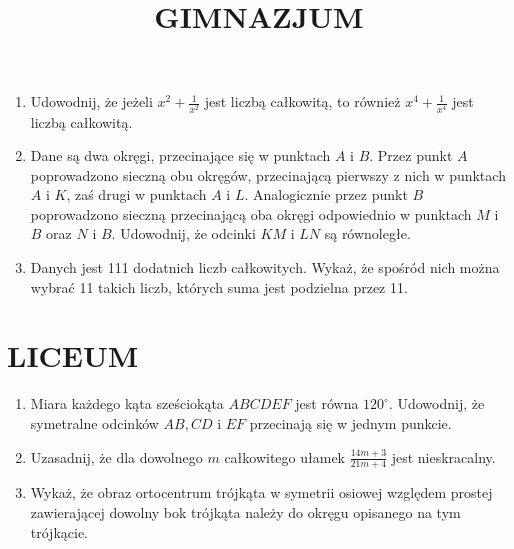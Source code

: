 \documentclass[10pt]{article}
\title{GIMNAZJUM }
\author{}
\date{}
\begin{document}
\maketitle
\begin{enumerate}
  \item Udowodnij, że jeżeli \(x^{2}+\frac{1}{x^{2}}\) jest liczbą całkowitą, to również \(x^{4}+\frac{1}{x^{4}}\) jest liczbą całkowitą.
  \item Dane są dwa okręgi, przecinające się w punktach \(A\) i \(B\). Przez punkt \(A\) poprowadzono sieczną obu okręgów, przecinającą pierwszy z nich w punktach \(A\) i \(K\), zaś drugi w punktach \(A\) i \(L\). Analogicznie przez punkt \(B\) poprowadzono sieczną przecinającą oba okręgi odpowiednio w punktach \(M\) i \(B\) oraz \(N\) i \(B\). Udowodnij, że odcinki \(K M\) i \(L N\) są równoległe.
  \item Danych jest 111 dodatnich liczb całkowitych. Wykaż, że spośród nich można wybrać 11 takich liczb, których suma jest podzielna przez 11.
\end{enumerate}

\section*{LICEUM}
\begin{enumerate}
  \item Miara każdego kąta sześciokąta \(A B C D E F\) jest równa \(120^{\circ}\). Udowodnij, że symetralne odcinków \(A B, C D\) i \(E F\) przecinają się w jednym punkcie.
  \item Uzasadnij, że dla dowolnego \(m\) całkowitego ułamek \(\frac{14 m+3}{21 m+4}\) jest nieskracalny.
  \item Wykaż, że obraz ortocentrum trójkąta w symetrii osiowej względem prostej zawierającej dowolny bok trójkąta należy do okręgu opisanego na tym trójkącie.
\end{enumerate}
\end{document}
